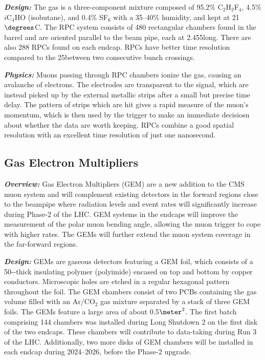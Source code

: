 \textbf{\textit{Design:}}
The gas is a three-component mixture composed of 95.2\% C$_2$H$_2$F$_4$, 4.5\% $i$C$_4$HO (isobutane), and 0.4\% SF$_6$ with a 35--40\% humidity, and kept at 21$\degrees$C.
The RPC system consists of 480 rectangular chambers found in the barrel and are oriented parallel to the beam pipe, each at 2.455\meter long.
There are also 288 RPCs found on each endcap.
RPCs have better time resolution compared to the 25\ns between two consecutive \pp bunch crossings. 


\textbf{\textit{Physics:}}
Muons passing through RPC chambers ionize the gas, causing an avalanche of electrons.
The electrodes are transparent to the signal, which are instead picked up by the external metallic strips after a small but precise time delay.
The pattern of strips which are hit gives a rapid measure of the muon's momentum, which is then used by the trigger to make an immediate decisiosn about whether the data are worth keeping.
RPCs combine a good spatial resolution with an excellent time resolution of just one nanosecond. 

\subsection{Gas Electron Multipliers}
\label{sec:gem}

\textbf{\textit{Overview:}}
Gas Electron Multipliers (GEM) are a new addition to the CMS muon system and will complement existing detectors in the forward regions close to the beampipe where radiation levels and event rates will significantly increase during Phase-2 of the LHC.
GEM systems in the endcaps will improve the measurement of the polar muon bending angle, allowing the muon trigger to cope with higher rates.
The GEMs will further extend the muon system coverage in the far-forward regions. 

\textbf{\textit{Design:}}
GEMs are gaseous detectors featuring a GEM foil, which consists of a 50-\mumns-thick insulating polymer (polyimide) encased on top and bottom by copper conductors.
Microscopic holes are etched in a regular hexagonal pattern throughout the foil.
The GEM chambers consist of two PCBs containing the gas volume filled with an Ar/CO$_2$ gas mixture separated by a stack of three GEM foils.
The GEMs feature a large area of about 0.5$\meter^2$.
The first batch comprising 144 chambers was installed during Long Shutdown 2 on the first disk of the two endcaps.
These chambers will contribute to data-taking during Run 3 of the LHC.
Additionally, two more disks of GEM chambers will be installed in each endcap during 2024--2026, before the Phase-2 upgrade.

